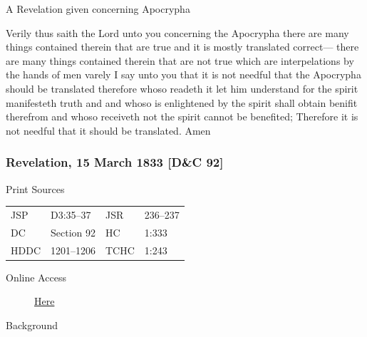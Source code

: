 				A Revelation given concerning Apocrypha
				
				Verily thus saith the Lord unto you concerning the Apocrypha there are many things contained therein that are true and it is mostly translated correct--- there are many things contained therein that are not true which are interpelations by the hands of men varely I say unto you that it is not needful that the Apocrypha should be translated therefore whoso readeth it let him understand for the spirit manifesteth truth and and whoso is enlightened by the spirit shall obtain benifit therefrom and whoso receiveth not the spirit cannot be benefited; Therefore it is not needful that it should be translated. Amen
				
		\subsubsection{Revelation, 15 March 1833 [D\&C 92]}
			\label{EMS-1833-JS-15-MAR-1833}
		
			\begin{description}
				\item[Print Sources]
			\end{description}

				\begin{tabular}{p{0.5in}p{1in}p{0.5in}p{1in}}
				JSP	 	& D3:35--37			& JSR 		& 236--237 \\
				DC	 	& Section 92 		& HC 		& 1:333 \\
				HDDC 	& 1201--1206		& TCHC 		& 1:243 \\
				\end{tabular}
			
			\begin{description}
				\item[Online Access] \href{https://www.josephsmithpapers.org/paper-summary/revelation-15-march-1833-dc-92/1}{Here}
			\end{description}
			
			\begin{description}
				\item[Background]
			\end{description}
			
			
